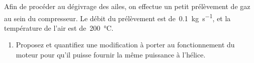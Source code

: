 	Afin de procéder au dégivrage des ailes, on effectue un petit prélèvement de gaz au sein du compresseur. Le débit du prélèvement est de~\SI{0,1}{\kilogram\per\second}, et la température de l’air est de~\SI{200}{\degreeCelsius}.
	
	\begin{enumerate}
		\item Proposez et quantifiez une modification à porter au fonctionnement du moteur pour qu’il puisse fournir la même puissance à l’hélice.
	\end{enumerate}
	
	\onlyamphibook{\begin{figure}[h!]}
	\onlyframabook{\begin{figure}[htc]}%
		\begin{center}
\end{center}
